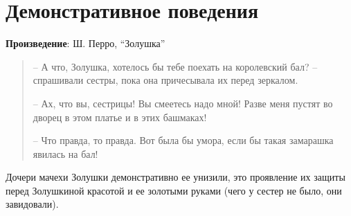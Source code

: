 \section{Демонстративное поведения}

\textbf{Произведение}: Ш. Перро, “Золушка”

\begin{quote}
    – А что, Золушка, хотелось бы тебе поехать на королевский бал? – спрашивали сестры, пока она причесывала их перед зеркалом.
    
    – Ах, что вы, сестрицы! Вы смеетесь надо мной! Разве меня пустят во дворец в этом платье и в этих башмаках!
    
    – Что правда, то правда. Вот была бы умора, если бы такая замарашка явилась на бал!
\end{quote}

Дочери мачехи Золушки демонстративно ее унизили, это проявление их защиты перед Золушкиной красотой и ее золотыми руками (чего у сестер не было, они завидовали).
